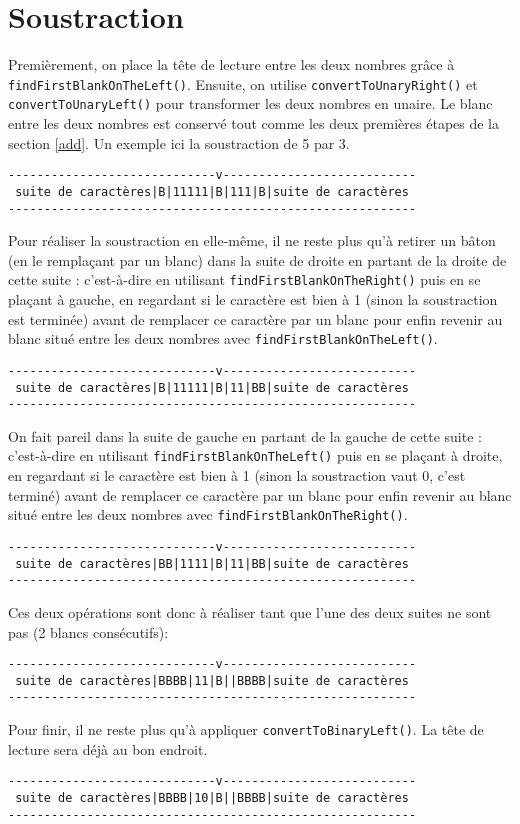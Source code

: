 \documentclass[a4paper,11pt]{article}
\begin{document}
\section{Soustraction}
Premièrement, on place la tête de lecture entre les deux nombres grâce à \texttt{findFirstBlankOn\-The\-Left()}.
Ensuite, on utilise \texttt{convertToUnaryRight()} et \texttt{convertToUnaryLeft()} pour transformer les deux nombres en unaire. Le blanc entre les deux nombres est conservé tout comme les deux premières étapes de la section \ref{add}. Un exemple ici la soustraction de 5 par 3.
\begin{verbatim}
-----------------------------v---------------------------
 suite de caractères|B|11111|B|111|B|suite de caractères
---------------------------------------------------------
\end{verbatim}
Pour réaliser la soustraction en elle-même, il ne reste plus qu'à retirer un bâton (en le remplaçant par un blanc) dans la suite de droite en partant de la droite de cette suite : c'est-à-dire en utilisant \texttt{findFirstBlankOnTheRight()} puis en se plaçant à gauche, en regardant si le caractère est bien à 1 (sinon la soustraction est terminée) avant de remplacer ce caractère par un blanc pour enfin revenir au blanc situé entre les deux nombres avec \texttt{findFirstBlankOnTheLeft()}.\\
\begin{verbatim}
-----------------------------v---------------------------
 suite de caractères|B|11111|B|11|BB|suite de caractères
---------------------------------------------------------
\end{verbatim}
On fait pareil dans la suite de gauche en partant de la gauche de cette suite : c'est-à-dire en utilisant \texttt{findFirstBlankOnTheLeft()} puis en se plaçant à droite, en regardant si le caractère  est bien à 1 (sinon la soustraction vaut 0, c'est terminé) avant de remplacer ce caractère par un blanc pour enfin revenir au blanc situé entre les deux nombres avec \texttt{findFirstBlankOnTheRight()}.\\
\begin{verbatim}
-----------------------------v---------------------------
 suite de caractères|BB|1111|B|11|BB|suite de caractères
---------------------------------------------------------
\end{verbatim}
Ces deux opérations sont donc à réaliser tant que l'une des deux suites ne sont pas (2 blancs consécutifs):
\begin{verbatim}
-----------------------------v---------------------------
 suite de caractères|BBBB|11|B||BBBB|suite de caractères
---------------------------------------------------------
\end{verbatim}
Pour finir, il ne reste plus qu'à appliquer \texttt{convertToBinaryLeft()}. La tête de lecture sera déjà au bon endroit.
\begin{verbatim}
-----------------------------v---------------------------
 suite de caractères|BBBB|10|B||BBBB|suite de caractères
---------------------------------------------------------
\end{verbatim}
\end{document}
